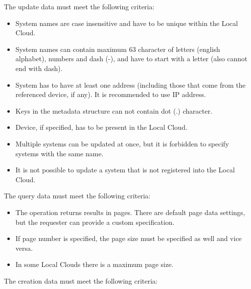 \documentclass[a4paper]{arrowhead}
\begin{document}

The update data must meet the following criteria:

\begin{itemize}
    \item System names are case insensitive and have to be unique within the Local Cloud.
    \item System names can contain maximum 63 character of letters (english alphabet), numbers and dash (-), and have to start with a letter (also cannot end with dash).
    \item System has to have at least one address (including those that come from the referenced device, if any). It is recommended to use IP address. 
    \item Keys in the metadata structure can not contain dot (.) character.
    \item Device, if specified, has to be present in the Local Cloud.
    \item Multiple systems can be updated at once, but it is forbidden to specify systems with the same name.
    \item It is not possible to update a system that is not registered into the Local Cloud.
\end{itemize}



The query data must meet the following criteria:

\begin{itemize}
    \item The operation returns results in pages. There are default page data settings, but the requester can provide a custom specification.
    \item If page number is specified, the page size must be specified as well and vice versa.
    \item In some Local Clouds there is a maximum page size.
\end{itemize}


The creation data must meet the following criteria:
\end{document}
